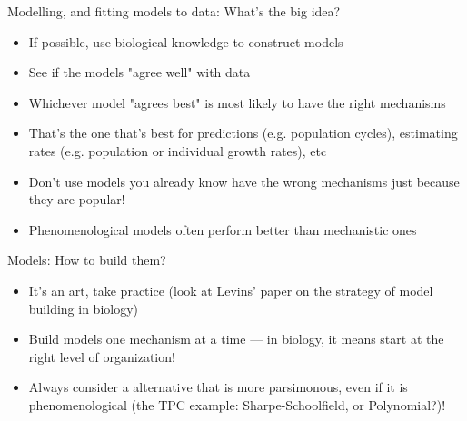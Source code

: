 \documentclass[xcolor=x11names,handout,compress]{beamer}
\renewcommand{\(}{\begin{columns}}
\renewcommand{\)}{\end{columns}}
\newcommand{\<}[1]{\begin{column}{#1}}
\renewcommand{\>}{\end{column}}
\begin{document}
\begin{frame}{Modelling, and fitting models to data: What's the big idea?}

\begin{itemize} \itemsep8pt

	\item If possible, use biological knowledge to construct models
	\item See if the models "agree well" with data
	\item Whichever model "agrees best" is most likely to have the right 
	mechanisms
	\item That's the one that's best for predictions (e.g. population 
	cycles), estimating rates (e.g. population or individual growth rates), etc
	\item Don't use models you already know have the wrong mechanisms just because they are popular!
	\item Phenomenological models often perform better than mechanistic ones

\end{itemize}
  
\end{frame}


\begin{frame}{Models: How to build them?}

\begin{itemize}\itemsep10pt

	\item It's an art, take practice (look at Levins' paper on the 
	strategy of model building in biology)
	\item Build models one mechanism at a time --- in biology, it means 
	start at the right level of organization! 
	\item Always consider a alternative that is more parsimonous, even if 
	it is phenomenological (the TPC example: Sharpe-Schoolfield, or Polynomial?)! 
\end{itemize}


	
\end{frame}

\end{document}
